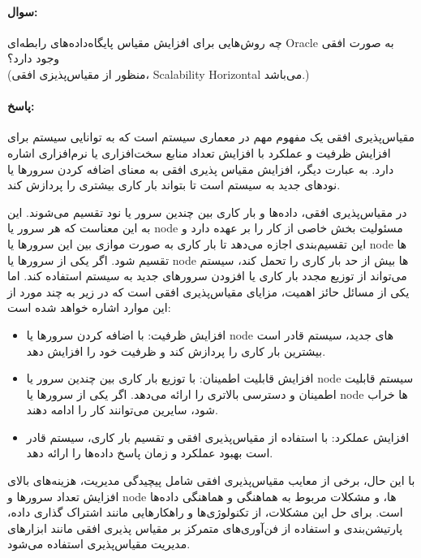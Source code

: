 \documentclass[a4paper,10pt]{article}
\begin{document}
    \paragraph{سوال:} چه روش‌هایی برای افزایش مقیاس پایگاه‌داده‌های رابطه‌ای Oracle به صورت افقی وجود دارد؟\\(منظور از مقیاس‌پذیزی افقی، Scalability Horizontal می‌باشد.)

    \paragraph{پاسخ:} مقیاس‌پذیری افقی یک مفهوم مهم در معماری سیستم است که به توانایی سیستم برای افزایش ظرفیت و عملکرد با افزایش تعداد منابع سخت‌افزاری یا نرم‌افزاری اشاره دارد. به عبارت دیگر، افزایش مقیاس پذیری افقی به معنای اضافه کردن سرورها یا نودهای جدید به سیستم است تا بتواند بار کاری بیشتری را پردازش کند.

    در مقیاس‌پذیری افقی، داده‌ها و بار کاری بین چندین سرور یا نود تقسیم می‌شوند. این به این معناست که هر سرور یا node مسئولیت بخش خاصی از کار را بر عهده دارد و این تقسیم‌بندی اجازه می‌دهد تا بار کاری به صورت موازی بین این سرورها یا node ها تقسیم شود. اگر یکی از سرورها یا node ها بیش از حد بار کاری را تحمل کند، سیستم می‌تواند از توزیع مجدد بار کاری یا افزودن سرورهای جدید به سیستم استفاده کند. اما یکی از مسائل حائز اهمیت، مزایای مقیاس‌پذیری افقی است که در زیر به چند مورد از این موارد اشاره خواهد شده است:

    \begin{itemize}
        
        \item افزایش ظرفیت: با اضافه کردن سرورها یا node های جدید، سیستم قادر است بیشترین بار کاری را پردازش کند و ظرفیت خود را افزایش دهد.

        \item افزایش قابلیت اطمینان: با توزیع بار کاری بین چندین سرور یا node سیستم قابلیت اطمینان و دسترسی بالاتری را ارائه می‌دهد. اگر یکی از سرورها یا node ها خراب شود، سایرین می‌توانند کار را ادامه دهند.

        \item افزایش عملکرد: با استفاده از مقیاس‌پذیری افقی و تقسیم بار کاری، سیستم قادر است بهبود عملکرد و زمان پاسخ داده‌ها را ارائه دهد.

    \end{itemize}

    با این حال، برخی از معایب مقیاس‌پذیری افقی شامل پیچیدگی مدیریت، هزینه‌های بالای افزایش تعداد سرورها و node ها، و مشکلات مربوط به هماهنگی و هماهنگی داده‌ها است. برای حل این مشکلات، از تکنولوژی‌ها و راهکارهایی مانند اشتراک گذاری داده، پارتیشن‌بندی و استفاده از فن‌آوری‌های متمرکز بر مقیاس پذیری افقی مانند ابزارهای مدیریت مقیاس‌پذیری استفاده می‌شود.
\end{document}
